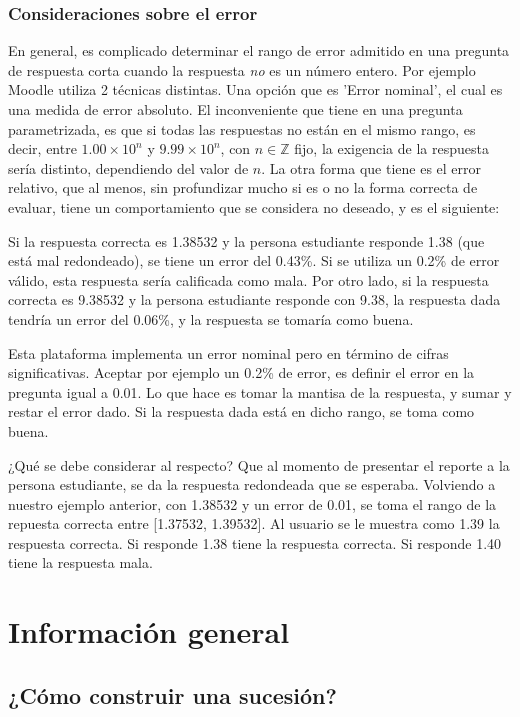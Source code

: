 \documentclass[12pt]{article}
\theoremstyle{definition}
\begin{document}
\subsubsection{Consideraciones sobre el error}
En general, es complicado determinar el rango de error admitido en una pregunta de respuesta corta cuando la respuesta \emph{no} es un número entero. Por ejemplo Moodle utiliza 2 técnicas distintas. Una opción que es 'Error nominal', el cual es una medida de error absoluto. El inconveniente que tiene en una pregunta parametrizada, es que si todas las respuestas no están en el mismo rango, es decir, entre $1.00\times 10^n$ y $9.99\times 10^n$, con $n\in\mathbb Z$ fijo, la exigencia de la respuesta sería distinto, dependiendo del valor de $n$. La otra forma que tiene es el error relativo, que al menos, sin profundizar mucho si es o no la forma correcta de evaluar, tiene un comportamiento que se considera no deseado, y es el siguiente:

Si la respuesta correcta es 1.38532 y la persona estudiante responde 1.38 (que está mal redondeado), se tiene un error del 0.43\%. Si se utiliza un 0.2\% de error válido, esta respuesta sería calificada como mala. Por otro lado, si la respuesta correcta es 9.38532 y la persona estudiante responde con 9.38, la respuesta dada tendría un error del 0.06\%, y la respuesta se tomaría como buena.

Esta plataforma implementa un error nominal pero en término de cifras significativas. Aceptar por ejemplo un 0.2\% de error, es definir el error en la pregunta igual a 0.01. Lo que hace es tomar la mantisa de la respuesta, y sumar y restar el error dado. Si la respuesta dada está en dicho rango, se toma como buena.

¿Qué se debe considerar al respecto? Que al momento de presentar el reporte a la persona estudiante, se da la respuesta redondeada que se esperaba. Volviendo a nuestro ejemplo anterior, con 1.38532 y un error de 0.01, se toma el rango de la repuesta correcta entre [1.37532, 1.39532]. Al usuario se le muestra como 1.39 la respuesta correcta. Si responde 1.38 tiene la respuesta correcta. Si responde 1.40 tiene la respuesta mala.

\section{Informaci\'on general}

\subsection{¿Cómo construir una sucesión?}
\end{document}
